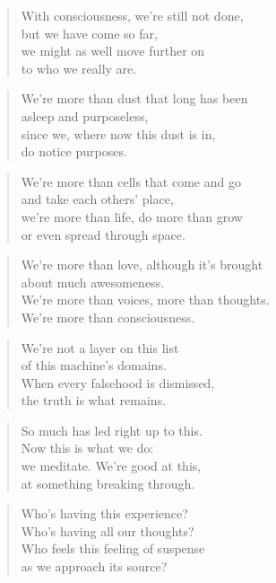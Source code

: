 \documentclass[10pt,a4paper]{article}
\begin{document}
\begin{multicols}{2}
\begin{verse}
With consciousness, we’re still not done,\\
but we have come so far,\\
we might as well move further on\\
to who we really are.
\end{verse}

\begin{verse}
We’re more than dust that long has been\\
asleep and purposeless,\\
since we, where now this dust is in,\\
do notice purposes.
\end{verse}

\begin{verse}
We’re more than cells that come and go\\
and take each others’ place,\\
we’re more than life, do more than grow\\
or even spread through space.
\end{verse}

\begin{verse}
We’re more than love, although it’s brought\\
about much awesomeness.\\
We’re more than voices, more than thoughts.\\
We’re more than consciousness.
\end{verse}

\begin{verse}
We’re not a layer on this list\\
of this machine’s domains.\\
When every falsehood is dismissed,\\
the truth is what remains.
\end{verse}

\begin{verse}
So much has led right up to this.\\
Now this is what we do:\\
we meditate. We’re good at this,\\
at something breaking through.
\end{verse}

\begin{verse}
Who’s having this experience?\\
Who’s having all our thoughts?\\
Who feels this feeling of suspense\\
as we approach its source?
\end{verse}


\end{multicols}
\end{document}
